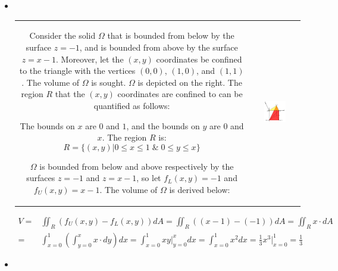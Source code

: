 \documentclass{article}
\begin{document}
\begin{itemize}
\item ~~\\ 

\begin{tabular}{cc}
\parbox{0.5\textwidth}{
Consider the solid \(\Omega\) that is bounded from below by the surface \(z = -1\), and is bounded from above by the surface \(z = x - 1\). Moreover, let the \((x,y)\) coordinates be confined to the triangle with the vertices \((0, 0)\), \((1, 0)\), and \((1, 1)\). The volume of \(\Omega\) is sought. \(\Omega\) is depicted on the right. The region \(R\) that the \((x, y)\) coordinates are confined to can be quantified as follows: 

The bounds on \(x\) are \(0\) and \(1\), and the bounds on \(y\) are \(0\) and \(x\). The region \(R\) is:
\[R = \{(x,y) | 0 \leq x \leq 1 \;\&\; 0 \leq y \leq x\}\] 

\(\Omega\) is bounded from below and above respectively by the surfaces \(z = -1\) and \(z = x - 1\), so let \(f_L(x,y) = -1\) and \(f_U(x,y) = x - 1\). The volume of \(\Omega\) is derived below:
} & \parbox{0.5\textwidth}{
\includegraphics[width = 0.5\textwidth]{volume_example_1}
}
\end{tabular}

\begin{align*}
V = & \iint_R (f_U(x,y) - f_L(x,y))dA 
= \iint_R ((x-1) - (-1))dA 
= \iint_R x \cdot dA \\ 
= & \int_{x = 0}^1 \left(\int_{y = 0}^x x \cdot dy\right)dx
= \int_{x = 0}^1 xy \bigg|_{y = 0}^x dx 
= \int_{x = 0}^1 x^2 dx 
= \frac{1}{3}x^3\bigg|_{x=0}^1 
= \frac{1}{3}
\end{align*}

\item ~~\\ 


\end{itemize}
\end{document}
